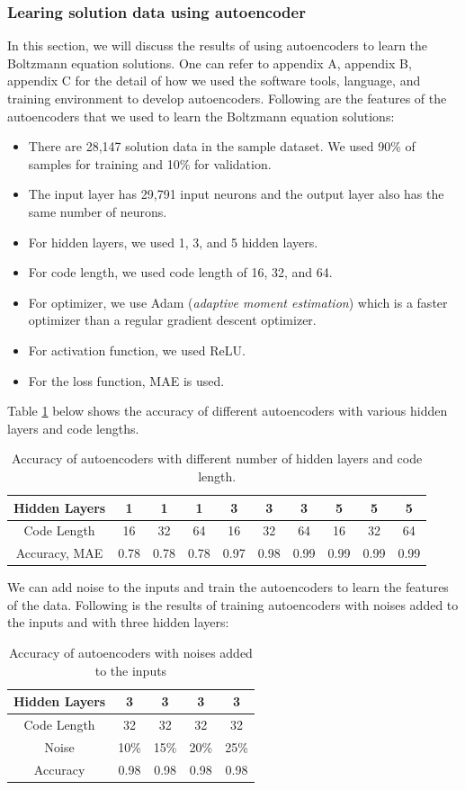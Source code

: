 \documentclass{article}
\begin{document}
\subsubsection{Learing solution data using autoencoder}
In this section, we will discuss the results of using autoencoders to learn the Boltzmann equation solutions. One can refer to appendix A, appendix B, appendix C for the detail of how we used the software tools, language, and training environment to develop autoencoders. Following are the features of the autoencoders that we used to learn the Boltzmann equation solutions:
\begin{itemize}
	\item There are 28,147 solution data in the sample dataset. We used 90\% of samples for training and 10\% for validation.
	\item The input layer has 29,791 input neurons and the output layer also has the same number of neurons.
	\item For hidden layers, we used 1, 3, and 5 hidden layers.
	\item For code length, we used code length of 16, 32, and 64.
	\item For optimizer, we use Adam (\emph{adaptive moment estimation}) which is a faster optimizer than a regular gradient descent optimizer.
	\item For activation function, we used ReLU.
	\item For the loss function, MAE is used.
\end{itemize}
Table \ref{table:ae} below shows the accuracy of different autoencoders with various hidden layers and code lengths.

\begin{table} [h!]
\centering
\begin{tabular}{c|c|c|c|c|c|c|c|c|c}
	Hidden Layers & 1 & 1 & 1 & 3 & 3 & 3 & 5 & 5 & 5 \\
	\hline
	Code Length & 16 & 32 & 64 & 16 & 32 & 64 & 16 & 32 & 64 \\
	\hline
	Accuracy, MAE & 0.78 & 0.78 & 0.78 & 0.97 & 0.98 & 0.99 & 0.99 & 0.99 & 0.99
\end{tabular}
\caption{Accuracy of autoencoders with different number of hidden layers and code length.}
\label{table:ae}
\end{table}
We can add noise to the inputs and train the autoencoders to learn the features of the data. Following is the results of training autoencoders with noises added to the inputs and with three hidden layers: 
\begin{table} [h!]
\centering
\begin{tabular}{c|c|c|c|c}
	Hidden Layers & 3 & 3 & 3 & 3 \\
	\hline 
	Code Length & 32 & 32 & 32 & 32 \\
	\hline
	Noise & 10\% & 15\% & 20\% & 25\% \\ 
	\hline
	Accuracy & 0.98 & 0.98 & 0.98 & 0.98
\end{tabular}
\caption{Accuracy of autoencoders with noises added to the inputs}
\label{table:ae_noise}
\end{table}
\end{document}
